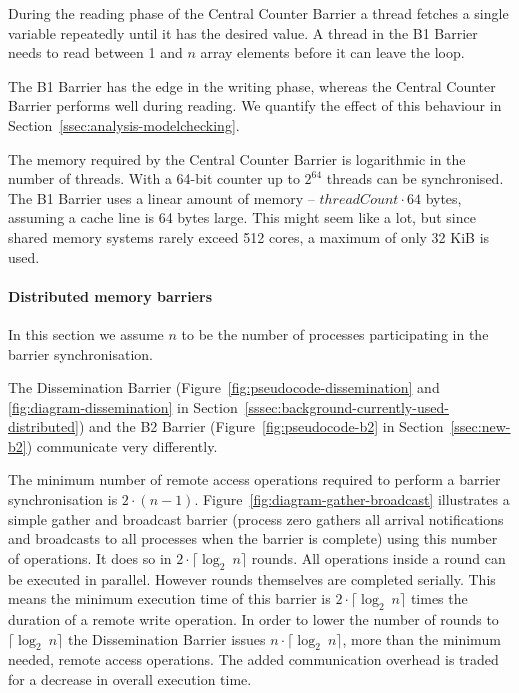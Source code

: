 \documentclass[a4paper, 10pt]{article}
\begin{document}
During the reading phase of the Central Counter Barrier a thread fetches a single variable repeatedly until it has the desired value. A thread in the B1 Barrier needs to read between 1 and $n$ array elements before it can leave the loop.

The B1 Barrier has the edge in the writing phase, whereas the Central Counter Barrier performs well during reading. We quantify the effect of this behaviour in Section~\ref{ssec:analysis-modelchecking}.

The memory required by the Central Counter Barrier is logarithmic in the number of threads. With a 64-bit counter up to $2^{64}$ threads can be synchronised. The B1 Barrier uses a linear amount of memory -- $\mathit{threadCount} \cdot 64$ bytes, assuming a cache line is 64 bytes large. This might seem like a lot, but since shared memory systems rarely exceed 512 cores, a maximum of only 32 KiB is used.

\paragraph{Distributed memory barriers}
\label{sssec:analysis-general-distributed}
In this section we assume $n$ to be the number of processes participating in the barrier synchronisation.

The Dissemination Barrier (Figure~\ref{fig:pseudocode-dissemination} and \ref{fig:diagram-dissemination} in Section~\ref{sssec:background-currently-used-distributed}) and the B2 Barrier (Figure~\ref{fig:pseudocode-b2} in Section~\ref{ssec:new-b2}) communicate very differently.

The minimum number of remote access operations required to perform a barrier synchronisation is $2 \cdot (n-1)$. Figure~\ref{fig:diagram-gather-broadcast} illustrates a simple gather and broadcast  barrier (process zero gathers all arrival notifications and broadcasts to all processes when the barrier is complete) using this number of operations. It does so in $2 \cdot  \lceil \log _2~n \rceil$ rounds. All operations inside a round can be executed in parallel. However rounds themselves are completed serially. This means the minimum execution time of this  barrier is $2 \cdot \lceil \log_2~n \rceil$ times the duration of a remote write operation. In order to lower the number of rounds to $\lceil \log _2~n \rceil$ the Dissemination Barrier issues $n \cdot \lceil \log _2~n \rceil$, more than the minimum needed, remote access operations. The added communication overhead is traded for a decrease in overall execution time.
\end{document}
